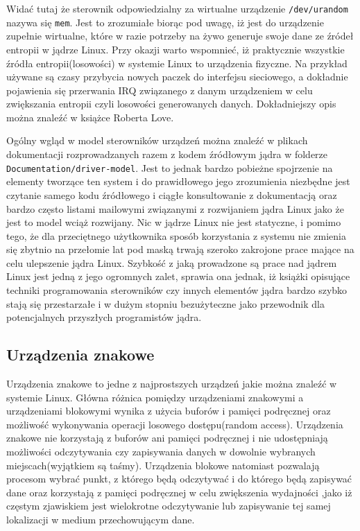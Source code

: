 \documentclass[10pt]{article}
\begin{document}
Widać tutaj że sterownik odpowiedzialny za wirtualne urządzenie \texttt{/dev/urandom} nazywa się \texttt{mem}. Jest to zrozumiałe biorąc pod uwagę, iż jest do urządzenie zupełnie wirtualne, które w razie potrzeby na żywo generuje swoje dane ze źródeł entropii w jądrze Linux.  Przy okazji warto wspomnieć, iż praktycznie wszystkie źródła entropii(losowości) w systemie Linux to urządzenia fizyczne. Na przykład używane są czasy przybycia nowych paczek do interfejsu sieciowego, a dokładnie pojawienia się przerwania IRQ związanego z danym urządzeniem w celu zwiększania entropii czyli losowości generowanych danych.  Dokładniejszy opis można znaleźć w książce Roberta Love\cite{linuxkerneldevel}.

Ogólny wgląd w model sterowników urządzeń można znaleźć w plikach dokumentacji rozprowadzanych razem z kodem źródłowym jądra w folderze \texttt{Documentation/driver-model}. Jest to jednak bardzo pobieżne spojrzenie na elementy tworzące ten system i do prawidłowego jego zrozumienia niezbędne jest czytanie samego kodu źródłowego i ciągłe konsultowanie z dokumentacją oraz bardzo często listami mailowymi związanymi z rozwijaniem jądra Linux jako że jest to model wciąż rozwijany. Nic w jądrze Linux nie jest statyczne, i pomimo tego, że dla przeciętnego użytkownika sposób korzystania z systemu nie zmienia się zbytnio na przełomie lat pod maską trwają szeroko zakrojone prace mające na celu ulepszenie jądra Linux. Szybkość z jaką prowadzone są prace nad jądrem Linux jest jedną z jego ogromnych zalet, sprawia ona jednak, iż książki opisujące techniki programowania sterowników czy innych elementów jądra bardzo szybko stają się przestarzałe i w dużym stopniu bezużyteczne jako przewodnik dla potencjalnych przyszłych programistów jądra.

\subsection{Urządzenia znakowe}
\label{chardevs}

Urządzenia znakowe to jedne z najprostszych urządzeń jakie można znaleźć w systemie Linux. Główna różnica pomiędzy urządzeniami znakowymi a urządzeniami blokowymi wynika z użycia buforów i pamięci podręcznej oraz możliwość wykonywania operacji losowego dostępu(random access).  Urządzenia znakowe nie korzystają z buforów ani pamięci podręcznej i nie udostępniają możliwości odczytywania czy zapisywania danych w dowolnie wybranych miejscach(wyjątkiem są taśmy). Urządzenia blokowe natomiast pozwalają procesom wybrać punkt, z którego będą odczytywać i do którego będą zapisywać dane oraz korzystają z pamięci podręcznej w celu zwiększenia wydajności ,jako iż częstym zjawiskiem jest wielokrotne odczytywanie lub zapisywanie tej samej lokalizacji w medium przechowującym dane.
\end{document}
